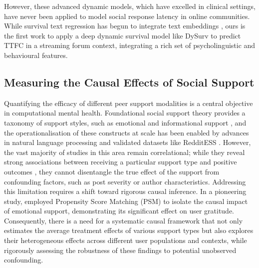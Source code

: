 \documentclass[letterpaper]{article} %
\begin{document}
However, these advanced dynamic models, which have excelled in clinical settings, have never been applied to model social response latency in online communities. While survival text regression has begun to integrate text embeddings \cite{de2021survival}, ours is the first work to apply a deep dynamic survival model like DySurv to predict TTFC in a streaming forum context, integrating a rich set of psycholinguistic and behavioural features.
\subsection{Measuring the Causal Effects of Social Support}
Quantifying the efficacy of different peer support modalities is a central objective in computational mental health. Foundational social support theory provides a taxonomy of support styles, such as emotional and informational support \cite{cutrona1992controllability}, and the operationalisation of these constructs at scale has been enabled by advances in natural language processing and validated datasets like RedditESS \cite{alghamdi2025redditess}. However, the vast majority of studies in this area remain correlational; while they reveal strong associations between receiving a particular support type and positive outcomes \cite{wang2012stay}, they cannot disentangle the true effect of the support from confounding factors, such as post severity or author characteristics. Addressing this limitation requires a shift toward rigorous causal inference. In a pioneering study, \citet{saha2020causal} employed Propensity Score Matching (PSM) to isolate the causal impact of emotional support, demonstrating its significant effect on user gratitude. Consequently, there is a need for a systematic causal framework that not only estimates the average treatment effects of various support types but also explores their heterogeneous effects across different user populations and contexts, while rigorously assessing the robustness of these findings to potential unobserved confounding.
\end{document}
